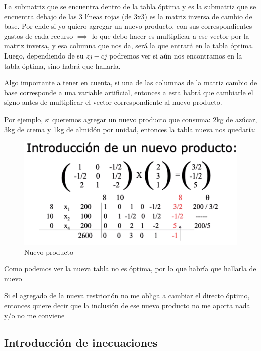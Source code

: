 \documentclass[titlepage,a4paper]{article}
\begin{document}
La submatriz que se encuentra dentro de la tabla óptima y es la submatriz que se encuentra debajo de las 3 líneas rojas (de 3x3) es la matriz inversa de cambio de base.
Por ende si yo quiero agregar un nuevo producto, con sus correspondientes gastos de cada recurso $\implies$ lo que debo hacer es multiplicar a ese vector por la matriz inversa, y esa columna que nos da, será la que entrará en la tabla óptima. Luego, dependiendo de su $zj - cj$ podremos ver si aún nos encontramos en la tabla óptima, sino habrá que hallarla.

Algo importante a tener en cuenta, si una de las columnas de la matriz cambio de base corresponde a una variable artificial, entonces a esta habrá que cambiarle el signo antes de multiplicar el vector correspondiente al nuevo producto.

Por ejemplo, si queremos agregar un nuevo producto que consuma: 2kg de azúcar, 3kg de crema y 1kg de almidón por unidad, entonces la tabla nueva nos quedaría:


\begin{figure}[H]
    \centering
    \includegraphics[scale=0.36]{nuevo_producto.png}
    \caption{Nuevo producto}
\end{figure}

Como podemos ver la nueva tabla no es óptima, por lo que habría que hallarla de nuevo

Si el agregado de la nueva restricción no me obliga a cambiar el directo óptimo, entonces quiere decir que la inclusión de ese nuevo producto no me aporta nada y/o no me conviene

\vspace{0.5cm}\vspace{0.5cm}

\subsection{Introducción de inecuaciones} 
\end{document}

